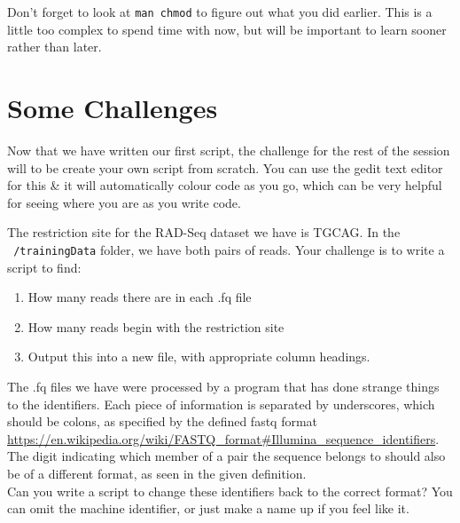 \documentclass[a4paper,12pt,twoside]{memoir}
\begin{document}
\begin{note}
Don't forget to look at \texttt{man chmod} to figure out what you did earlier.
This is a little too complex to spend time with now, but will be important to learn sooner rather than later.
\end{note}

\section{Some Challenges}
Now that we have written our first script, the challenge for the rest of the session will to be create your own script from scratch.
You can use the gedit text editor for this \& it will automatically colour code as you go, which can be very helpful for seeing where you are as you write code.

\begin{steps}
The restriction site for the RAD-Seq dataset we have is TGCAG.
In the \texttt{~/trainingData} folder, we have both pairs of reads.
Your challenge is to write a script to find:
\begin{enumerate}
\item How many reads there are in each .fq file
\item How many reads begin with the restriction site
\item Output this into a new file, with appropriate column headings. \\
\end{enumerate}
\end{steps}

\begin{steps}
The .fq files we have were processed by a program that has done strange things to the identifiers.
Each piece of information is separated by underscores, which should be colons, as specified by the defined fastq format \url{https://en.wikipedia.org/wiki/FASTQ_format#Illumina_sequence_identifiers}.
The digit indicating which member of a pair the sequence belongs to should also be of a different format, as seen in the given definition.\\

Can you write a script to change these identifiers back to the correct format? 
You can omit the machine identifier, or just make a name up if you feel like it.
\end{steps}
\end{document}
